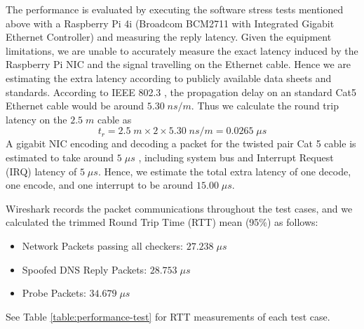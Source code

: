 \documentclass[a4paper]{report}
\begin{document}
The performance is evaluated by executing the software stress tests mentioned above with a Raspberry Pi 4i (Broadcom BCM2711 with Integrated Gigabit Ethernet Controller) and measuring the reply latency. Given the equipment limitations, we are unable to accurately measure the exact latency induced by the Raspberry Pi NIC and the signal travelling on the Ethernet cable. Hence we are estimating the extra latency according to publicly available data sheets and standards. According to IEEE 802.3 \cite{ieee802.3ethernet-2018}, the propagation delay on an standard Cat5 Ethernet cable would be around $5.30 \; ns/m$. Thus we calculate the round trip latency on the $2.5 \; m$ cable as  
$$
t_r = 2.5\; m \times 2 \times 5.30\; ns /m = 0.0265 \; \mu s
$$ 
A gigabit NIC encoding and decoding a packet for the twisted pair Cat 5 cable is estimated to take around $5 \; \mu s$ \cite{texas-instruments-dp83848x}, including system bus and Interrupt Request (IRQ) latency of $5 \; \mu s$. Hence, we estimate the total extra latency of one decode, one encode, and one interrupt to be around $15.00\; \mu s$.

Wireshark records the packet communications throughout the test cases, and we calculated the trimmed Round Trip Time (RTT) mean (95\%) as follows:
\begin{itemize}[noitemsep]
    \item Network Packets passing all checkers: $27.238\; \mu s$
    \item Spoofed DNS Reply Packets: $28.753\; \mu s$
    \item Probe Packets: $34.679\; \mu s$
\end{itemize}
See Table \ref{table:performance-test} for RTT measurements of each test case.
\end{document}
